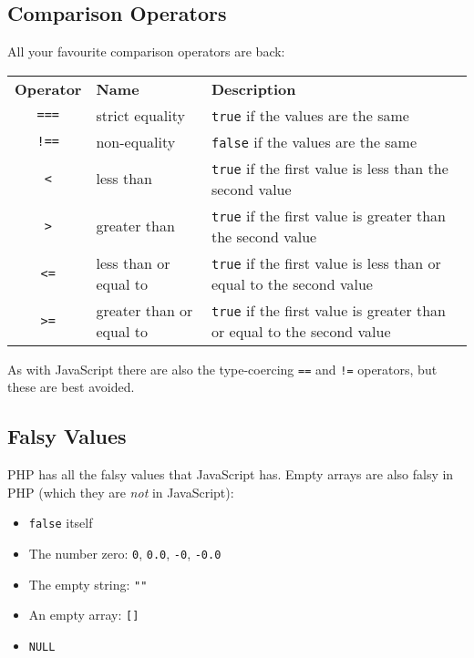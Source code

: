 \pagebreak


\subsection{Comparison Operators}

All your favourite comparison operators are back:
\\

\begin{small}
    \begin{tabularx}{\textwidth}{c l X}
        \textbf{Operator} & \textbf{Name} & \textbf{Description} \\
        \texttt{===} & strict equality & \texttt{true} if the values are the same \\
        \texttt{!==} & non-equality & \texttt{false} if the values are the same\\
        \texttt{<} & less than & \texttt{true} if the first value is less than the second value  \\
        \texttt{>} & greater than & \texttt{true} if the first value is greater than the second value\\
        \texttt{<=} & less than or equal to & \texttt{true} if the first value is less than or equal to the second value  \\
        \texttt{>=} & greater than or equal to & \texttt{true} if the first value is greater than or equal to the second value
    \end{tabularx}
\end{small}

\par\bigskip

As with JavaScript there are also the type-coercing \texttt{==} and \texttt{!=} operators, but these are best avoided.


\subsection{Falsy Values}

PHP has all the falsy values that JavaScript has. Empty arrays are also falsy in PHP (which they are \textit{not} in JavaScript):

\begin{itemize}
    \item \texttt{false} itself
    \item The number zero: \texttt{0}, \texttt{0.0}, \texttt{-0}, \texttt{-0.0}
    \item The empty string: \texttt{""}
    \item An empty array: \texttt{[]}
    \item \texttt{NULL}
\end{itemize}



